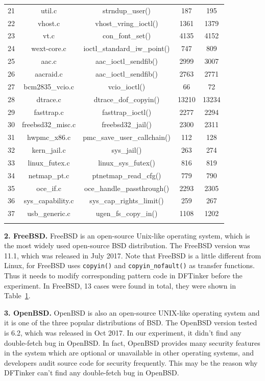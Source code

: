 \documentclass[10pt]{llncs}
\begin{document}
\begin{table}[htb!]
\begin{tabular}{ccccc}
    21 & util.c & strndup\_user() & 187 & 195 \\
    22 & vhost.c & vhost\_vring\_ioctl() & 1361 & 1379 \\
    23 & vt.c & con\_font\_set() & 4135 & 4152 \\
    24 & wext-core.c & ioctl\_standard\_iw\_point() & 747 & 809 \\
    \hline
    25 & aac.c  & aac\_ioctl\_sendfib() & 2999 & 3007 \\
    26 & aacraid.c  & aac\_ioctl\_sendfib() & 2763 & 2771 \\
    27 & bcm2835\_vcio.c  & vcio\_ioctl() & 66 & 72 \\
    28 & dtrace.c  & dtrace\_dof\_copyin() & 13210 & 13234 \\
    29 & fasttrap.c  & fasttrap\_ioctl() & 2277 & 2294 \\
    30 & freebsd32\_misc.c  & freebsd32\_jail() & 2300 & 2311 \\
    31 & hwpmc\_x86.c  & pmc\_save\_user\_callchain() & 112 & 128 \\
    32 & kern\_jail.c  & sys\_jail() & 263 & 274 \\
    33 & linux\_futex.c  & linux\_sys\_futex() & 816 & 819 \\
    34 & netmap\_pt.c  & ptnetmap\_read\_cfg() & 779 & 790 \\
    35 & oce\_if.c  & oce\_handle\_passthrough() & 2293 & 2305 \\
    36 & sys\_capability.c  & sys\_cap\_rights\_limit() & 259 & 267 \\
    37 & usb\_generic.c  & ugen\_fs\_copy\_in() & 1108 & 1202 \\
    \hline
    \label{result}
  \end{tabular}
\end{table}


\textbf{2. FreeBSD.}
FreeBSD is an open-source Unix-like operating system, which is the most widely used open-source BSD distribution. The FreeBSD version was 11.1, which was released in July 2017. Note that FreeBSD is a little different from Linux, for FreeBSD uses \verb:copyin(): and \verb:copyin_nofault(): as transfer functions. Thus it needs to modify corresponding pattern code in DFTinker before the experiment. In FreeBSD, 13 cases were found in total, they were shown in Table~\ref{result}.



\textbf{3. OpenBSD.}
OpenBSD is also an open-source UNIX-like operating system and it is one of the three popular distributions of BSD. The OpenBSD version tested is 6.2, which was released in Oct 2017. In our experiment, it didn't find any double-fetch bug in OpenBSD. In fact, OpenBSD provides many security features in the system which are optional or unavailable in other operating systems, and developers audit source code for security frequently. This may be the reason why DFTinker can't find any double-fetch bug in OpenBSD.
\end{document}
